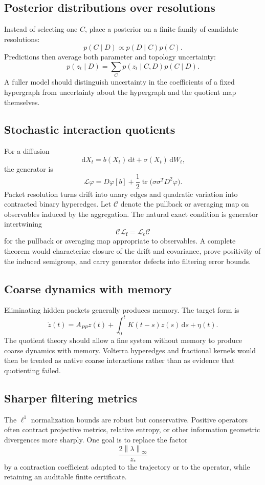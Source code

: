 \documentclass[11pt]{article}
\theoremstyle{definition}
\theoremstyle{remark}
\newcommand{\cC}{\mathcal C}
\newcommand{\cL}{\mathcal L}
\newcommand{\tr}{\operatorname{tr}}
\newcommand{\dd}{\,\mathrm d}
\newcommand{\norm}[1]{\left\lVert #1\right\rVert}
\newcommand{\fine}{\mathrm f}
\newcommand{\coarse}{\mathrm c}
\begin{document}
\subsection{Posterior distributions over resolutions}
Instead of selecting one $C$, place a posterior on a finite family of candidate resolutions:
\[
  p(C\mid D)
  \propto
  p(D\mid C)p(C).
\]
Predictions then average both parameter and topology uncertainty:
\[
  p(z_t\mid D)
  =
  \sum_Cp(z_t\mid C,D)p(C\mid D).
\]
A fuller model should distinguish uncertainty in the coefficients of a fixed hypergraph from uncertainty about the hypergraph and the quotient map themselves.

\subsection{Stochastic interaction quotients}
For a diffusion
\[
  \dd X_t=b(X_t)\dd t+\sigma(X_t)\dd W_t,
\]
the generator is
\[
  \cL\varphi
  =D\varphi[b]
  +\frac12\tr\bigl(\sigma\sigma^TD^2\varphi\bigr).
\]
Packet resolution turns drift into unary edges and quadratic variation into contracted binary hyperedges.  Let $\cC$ denote the pullback or averaging map on observables induced by the aggregation.  The natural exact condition is generator intertwining
\[
  \cC\cL_{\fine}=\cL_{\coarse}\cC
\]
for the pullback or averaging map appropriate to observables.  A complete theorem would characterize closure of the drift and covariance, prove positivity of the induced semigroup, and carry generator defects into filtering error bounds.

\subsection{Coarse dynamics with memory}
Eliminating hidden packets generally produces memory.  The target form is
\[
  \dot z(t)
  =A_{PP}z(t)
  +\int_0^tK(t-s)z(s)\dd s
  +\eta(t).
\]
The quotient theory should allow a fine system without memory to produce coarse dynamics with memory.  Volterra hyperedges and fractional kernels would then be treated as native coarse interactions rather than as evidence that quotienting failed.

\subsection{Sharper filtering metrics}
The $\ell^1$ normalization bounds are robust but conservative.  Positive operators often contract projective metrics, relative entropy, or other information geometric divergences more sharply.  One goal is to replace the factor
\[
  \frac{2\norm{\lambda}_{\infty}}{z_*}
\]
by a contraction coefficient adapted to the trajectory or to the operator, while retaining an auditable finite certificate.
\end{document}
